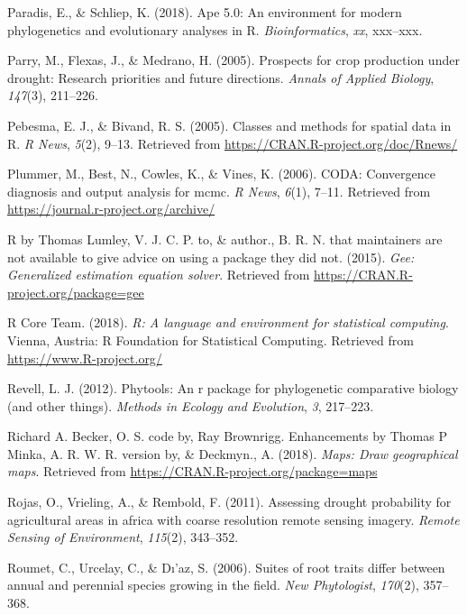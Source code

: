 \documentclass[man,floatsintext]{apa6}
\theoremstyle{definition}
\theoremstyle{definition}
\theoremstyle{definition}
\theoremstyle{remark}
\begin{document}
\leavevmode\hypertarget{ref-R-ape}{}%
Paradis, E., \& Schliep, K. (2018). Ape 5.0: An environment for modern
phylogenetics and evolutionary analyses in R. \emph{Bioinformatics},
\emph{xx}, xxx--xxx.

\leavevmode\hypertarget{ref-parry2005prospects}{}%
Parry, M., Flexas, J., \& Medrano, H. (2005). Prospects for crop
production under drought: Research priorities and future directions.
\emph{Annals of Applied Biology}, \emph{147}(3), 211--226.

\leavevmode\hypertarget{ref-R-sp}{}%
Pebesma, E. J., \& Bivand, R. S. (2005). Classes and methods for spatial
data in R. \emph{R News}, \emph{5}(2), 9--13. Retrieved from
\url{https://CRAN.R-project.org/doc/Rnews/}

\leavevmode\hypertarget{ref-R-coda}{}%
Plummer, M., Best, N., Cowles, K., \& Vines, K. (2006). CODA:
Convergence diagnosis and output analysis for mcmc. \emph{R News},
\emph{6}(1), 7--11. Retrieved from
\url{https://journal.r-project.org/archive/}

\leavevmode\hypertarget{ref-R-gee}{}%
R by Thomas Lumley, V. J. C. P. to, \& author., B. R. N. that
maintainers are not available to give advice on using a package they did
not. (2015). \emph{Gee: Generalized estimation equation solver}.
Retrieved from \url{https://CRAN.R-project.org/package=gee}

\leavevmode\hypertarget{ref-R-base}{}%
R Core Team. (2018). \emph{R: A language and environment for statistical
computing}. Vienna, Austria: R Foundation for Statistical Computing.
Retrieved from \url{https://www.R-project.org/}

\leavevmode\hypertarget{ref-R-phytools}{}%
Revell, L. J. (2012). Phytools: An r package for phylogenetic
comparative biology (and other things). \emph{Methods in Ecology and
Evolution}, \emph{3}, 217--223.

\leavevmode\hypertarget{ref-R-maps}{}%
Richard A. Becker, O. S. code by, Ray Brownrigg. Enhancements by Thomas
P Minka, A. R. W. R. version by, \& Deckmyn., A. (2018). \emph{Maps:
Draw geographical maps}. Retrieved from
\url{https://CRAN.R-project.org/package=maps}

\leavevmode\hypertarget{ref-rojas2011assessing}{}%
Rojas, O., Vrieling, A., \& Rembold, F. (2011). Assessing drought
probability for agricultural areas in africa with coarse resolution
remote sensing imagery. \emph{Remote Sensing of Environment},
\emph{115}(2), 343--352.

\leavevmode\hypertarget{ref-roumet2006suites}{}%
Roumet, C., Urcelay, C., \& Dı'az, S. (2006). Suites of root traits
differ between annual and perennial species growing in the field.
\emph{New Phytologist}, \emph{170}(2), 357--368.
\end{document}
